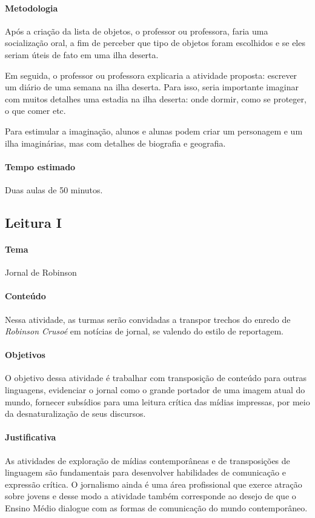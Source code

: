 \documentclass[12pt]{extarticle}
\begin{document}
\paragraph{Metodologia}
Após a criação da lista de objetos, o professor ou professora, faria uma
socialização oral, a fim de perceber que tipo de objetos foram
escolhidos e se eles seriam úteis de fato em uma ilha deserta.

Em seguida, o professor ou professora explicaria a atividade proposta:
escrever um diário de uma semana na ilha deserta. Para isso, seria
importante imaginar com muitos detalhes uma estadia na ilha deserta:
onde dormir, como se proteger, o que comer etc.

Para estimular a imaginação, alunos e alunas podem criar um personagem e
um ilha imaginárias, mas com detalhes de biografia e geografia.

\paragraph{Tempo estimado} Duas aulas de 50 minutos.

\subsection{Leitura I}

\paragraph{Tema} Jornal de Robinson

\paragraph{Conteúdo} Nessa atividade, as turmas serão convidadas a transpor trechos do enredo de \emph{Robinson Crusoé} em notícias de jornal, se valendo do estilo de
reportagem.

\paragraph{Objetivos}
O objetivo dessa atividade é trabalhar com transposição de conteúdo para
outras linguagens, evidenciar o jornal como o grande portador de uma
imagem atual do mundo, fornecer subsídios para uma leitura crítica das
mídias impressas, por meio da desnaturalização de seus discursos.

\paragraph{Justificativa}
As atividades de exploração de mídias contemporâneas e de transposições
de linguagem são fundamentais para desenvolver habilidades de
comunicação e expressão crítica. O jornalismo ainda é uma área
profissional que exerce atração sobre jovens e desse modo a atividade
também corresponde ao desejo de que o Ensino Médio dialogue com as
formas de comunicação do mundo contemporâneo.
\end{document}
